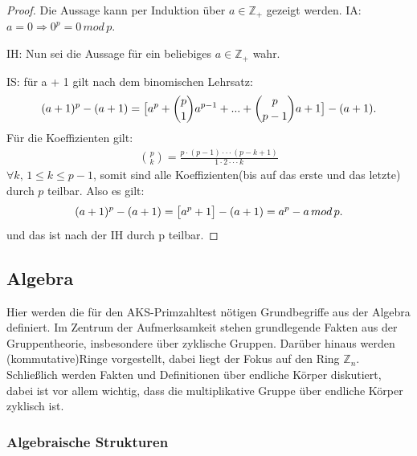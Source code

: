 \documentclass[12pt,oneside]{article}
\theoremstyle{remark}
\theoremstyle{definition}
\begin{document}
\begin{proof}
Die Aussage kann per Induktion über $a \in \mathbb{Z}_{+}$ gezeigt werden.\newline\newline
IA: $a = 0  \Rightarrow 0^p = 0 \, mod \, p$.\newline\newline

IH: Nun sei die Aussage für ein beliebiges $a \in \mathbb{Z}_{+}$ wahr.\newline\newline

IS: für a + 1 gilt nach dem binomischen Lehrsatz:
\begin{align*}
    (a + 1)^p - (a + 1) = \big{[}a^p + {p \choose 1}a^{p - 1} + ... +{p \choose p - 1} a + 1\big{]} - (a + 1).
\end{align*}
Für die Koeffizienten gilt: 
\begin{align*}
    {p \choose k} = \frac{p \cdot (p - 1) \cdot \cdot \cdot (p - k + 1)}{1 \cdot 2 \cdot \cdot \cdot k}
\end{align*}
$\forall k, \,  1 \leq k \leq p - 1$, somit sind alle Koeffizienten(bis auf das erste und das letzte) durch $p$ teilbar.\newline\newline
Also es gilt:
\begin{align*}
(a + 1)^p - (a + 1) = \big{[} a^p + 1 \big{]} - (a + 1) = a^p - a \, mod \, p.
\end{align*}
und das ist nach der IH durch p teilbar.\newline  
\end{proof}

\smallskip

\subsection{Algebra}
Hier werden die für den AKS-Primzahltest nötigen Grundbegriffe aus der Algebra definiert. Im Zentrum der Aufmerksamkeit stehen grundlegende Fakten aus der Gruppentheorie, insbesondere über zyklische Gruppen. Darüber hinaus werden (kommutative)Ringe vorgestellt, dabei liegt der Fokus auf den Ring $\mathbb{Z}_{n}$. Schließlich werden Fakten und Definitionen über endliche Körper diskutiert, dabei ist vor allem wichtig, dass die multiplikative Gruppe über endliche Körper zyklisch ist.   

\subsubsection{Algebraische Strukturen}
\end{document}

